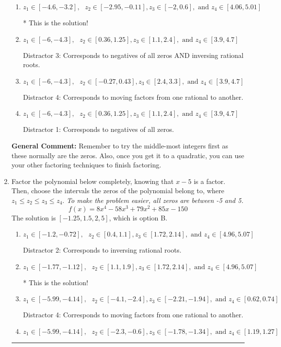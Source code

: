 \documentclass{extbook}[14pt]
\newcommand{\litem}[1]{\item #1

\rule{\textwidth}{0.4pt}}
\begin{document}
\begin{enumerate}
{\begin{enumerate}[label=\Alph*.]
 Distractor 2: Corresponds to inversing rational roots.
\item \( z_1 \in [-4.6, -3.2], \text{   }  z_2 \in [-2.95, -0.11], z_3 \in [-2, 0.6], \text{   and   } z_4 \in [4.06, 5.01] \)

* This is the solution!
\item \( z_1 \in [-6, -4.3], \text{   }  z_2 \in [0.36, 1.25], z_3 \in [1.1, 2.4], \text{   and   } z_4 \in [3.9, 4.7] \)

 Distractor 3: Corresponds to negatives of all zeros AND inversing rational roots.
\item \( z_1 \in [-6, -4.3], \text{   }  z_2 \in [-0.27, 0.43], z_3 \in [2.4, 3.3], \text{   and   } z_4 \in [3.9, 4.7] \)

 Distractor 4: Corresponds to moving factors from one rational to another.
\item \( z_1 \in [-6, -4.3], \text{   }  z_2 \in [0.36, 1.25], z_3 \in [1.1, 2.4], \text{   and   } z_4 \in [3.9, 4.7] \)

 Distractor 1: Corresponds to negatives of all zeros.
\end{enumerate}

\textbf{General Comment:} Remember to try the middle-most integers first as these normally are the zeros. Also, once you get it to a quadratic, you can use your other factoring techniques to finish factoring.
}
\litem{
Factor the polynomial below completely, knowing that $x-5$ is a factor. Then, choose the intervals the zeros of the polynomial belong to, where $z_1 \leq z_2 \leq z_3 \leq z_4$. \textit{To make the problem easier, all zeros are between -5 and 5.}
\[ f(x) = 8x^{4} -58 x^{3} +79 x^{2} +85 x -150 \]The solution is \( [-1.25, 1.5, 2, 5] \), which is option B.\begin{enumerate}[label=\Alph*.]
\item \( z_1 \in [-1.2, -0.72], \text{   }  z_2 \in [0.4, 1.1], z_3 \in [1.72, 2.14], \text{   and   } z_4 \in [4.96, 5.07] \)

 Distractor 2: Corresponds to inversing rational roots.
\item \( z_1 \in [-1.77, -1.12], \text{   }  z_2 \in [1.1, 1.9], z_3 \in [1.72, 2.14], \text{   and   } z_4 \in [4.96, 5.07] \)

* This is the solution!
\item \( z_1 \in [-5.99, -4.14], \text{   }  z_2 \in [-4.1, -2.4], z_3 \in [-2.21, -1.94], \text{   and   } z_4 \in [0.62, 0.74] \)

 Distractor 4: Corresponds to moving factors from one rational to another.
\item \( z_1 \in [-5.99, -4.14], \text{   }  z_2 \in [-2.3, -0.6], z_3 \in [-1.78, -1.34], \text{   and   } z_4 \in [1.19, 1.27] \)


\end{enumerate}}
\end{enumerate}
\end{document}
